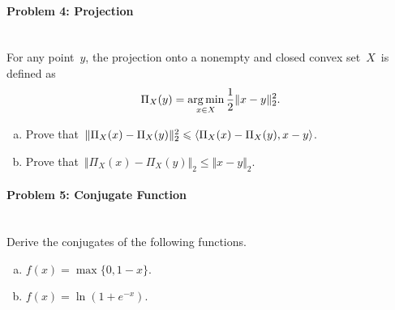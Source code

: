 \documentclass[a4paper]{article}
\newenvironment{solution}
{\color{blue} \paragraph{Solution.}}
{\newline \qed}
\begin{document}
\paragraph{Problem 4: Projection}
~\\

\noindent
For any point~$y$, the projection onto a nonempty and closed convex set~$X$~is defined as
\begin{equation}
\Pi_X (y) = \mathop{\arg\min}\limits_{x \in X} \frac{1}{2} \Vert x - y \Vert^2_2. \notag
\end{equation}

\begin{enumerate}[a)]
    \item Prove that~$\Vert \Pi_X (x) - \Pi_X (y) \Vert^2_2 \leqslant \Braket{\Pi_X (x) - \Pi_X (y), x - y}$.

    \item Prove that~$\Vert \Pi_X (x) - \Pi_X (y) \Vert_2 \leqslant \Vert x - y \Vert_2$.
\end{enumerate}



\paragraph{Problem 5: Conjugate Function}
~\\

\noindent
Derive the conjugates of the following functions.
\begin{enumerate}[a)]
    \item $f(x) = \max \{0, 1 - x\}$.

    \item $f(x) = \ln (1 + e^{-x})$.
\end{enumerate}


\end{document}
